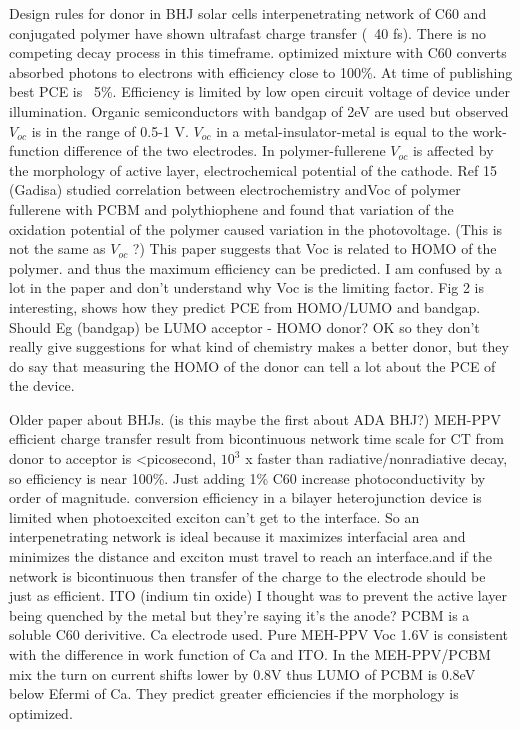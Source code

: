 \documentclass{article}
\begin{document}
\cite{Scharber2006a}
Design rules for donor in BHJ solar cells
interpenetrating network of C60 and conjugated polymer have shown ultrafast charge transfer (~40 fs). There is no competing decay process in this timeframe. optimized mixture with C60 converts absorbed photons to electrons with efficiency close to 100\%. At time of publishing best PCE is ~5\%. Efficiency is limited by low open circuit voltage of device under illumination. Organic semiconductors with bandgap of 2eV are used but observed $V_{oc}$ is in the range of 0.5-1 V. $V_{oc}$ in a metal-insulator-metal is equal to the work-function difference of the two electrodes. In polymer-fullerene $V_{oc}$ is affected by the morphology of active layer, electrochemical potential of the cathode. Ref 15 (Gadisa) studied correlation between electrochemistry andVoc of  polymer fullerene with PCBM and polythiophene and found that variation of the oxidation potential of the polymer caused variation in the photovoltage. (This is not the same as $V_{oc}$ ?) This paper suggests that Voc is related to HOMO of the polymer. and thus the maximum efficiency can be predicted.
I am confused by a lot in the paper and don't understand why Voc is the limiting factor. Fig 2 is interesting, shows how they predict PCE from HOMO/LUMO and bandgap. Should Eg (bandgap) be LUMO acceptor - HOMO donor?
OK so they don't really give suggestions for what kind of chemistry makes a better donor, but they do say that measuring the HOMO of the donor can tell a lot about the PCE of the device.

\cite{Yu1995}

Older paper about BHJs. (is this maybe the first about ADA BHJ?) MEH-PPV efficient charge transfer result from bicontinuous network
time scale for CT from donor to acceptor is <picosecond, $10^{3}$ x faster than radiative/nonradiative decay, so efficiency is near 100\%. Just adding 1\% C60 increase photoconductivity by order of magnitude.
conversion efficiency in a bilayer heterojunction device is limited when photoexcited exciton can't get to the interface. So an interpenetrating network is ideal because it maximizes interfacial area and minimizes the distance and exciton must travel to reach an interface.and if the network is bicontinuous then transfer of the charge to the electrode should be just as efficient.
ITO (indium tin oxide) I thought was to prevent the active layer being quenched by the metal but they're saying it's the anode? PCBM is a soluble C60 derivitive. Ca electrode used.
Pure MEH-PPV Voc 1.6V is consistent with the difference in work function of Ca and ITO. In the MEH-PPV/PCBM mix the turn on current shifts lower by 0.8V thus LUMO of PCBM is 0.8eV below Efermi of Ca. 
They predict greater efficiencies if the morphology is optimized.
\end{document}

